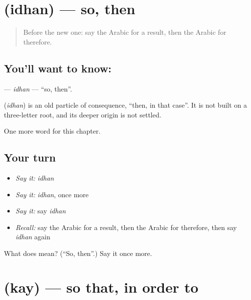 \section[\texorpdfstring{\ar{إذن} (idhan)}{إذن (idhan)}]{ (idhan) — so, then}

\label{lesson:AR-C174-idhan}



\begin{quote}
Before the new one: say the Arabic for a result, then the Arabic for therefore.
\end{quote}

\subsection*{You'll want to know: }
\textbf{} — \emph{idhan} — \textquotedblleft{}so, then\textquotedblright{}.

\begin{cousinweb}
\textbf{} (\emph{idhan}) is an old particle of consequence, \textquotedblleft{}then, in that case\textquotedblright{}. It is not built on a three-letter root, and its deeper origin is not settled.
\end{cousinweb}

\begin{grammarlens}[title={What you've built}]
One more word for this chapter.
\end{grammarlens}

\subsection*{Your turn}
\begin{itemize}
\raggedright
  \item \emph{Say it:} \emph{idhan}
  \item \emph{Say it:} \emph{idhan}, once more
  \item \emph{Say it:} say \emph{idhan}
  \item \emph{Recall:} say the Arabic for a result, then the Arabic for therefore, then say \emph{idhan} again
\end{itemize}

\begin{tcolorbox}[breakable,colback=teal!4,colframe=teal!35!black,title={Before you move on}]
What does  mean? (\textquotedblleft{}So, then\textquotedblright{}.) Say it once more.
\end{tcolorbox}
\section[\texorpdfstring{\ar{كي} (kay)}{كي (kay)}]{ (kay) — so that, in order to}

